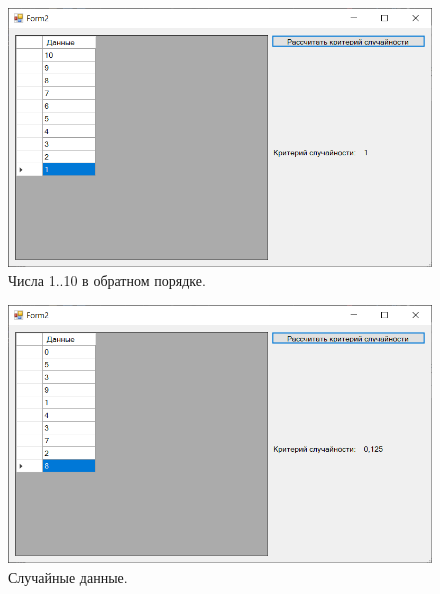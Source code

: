\documentclass[12pt]{report}
\begin{document}
\begin{figure}[H]
	\begin{center}
		\includegraphics[scale=0.8]{imgs/res2.png}
	\end{center}
	\caption{Числа 1..10 в обратном порядке.}
	\label{img:res2}
\end{figure}

\begin{figure}[H]
	\begin{center}
		\includegraphics[scale=0.8]{imgs/res3.png}
	\end{center}
	\caption{Случайные данные.}
	\label{img:res3}
\end{figure}
\end{document}
